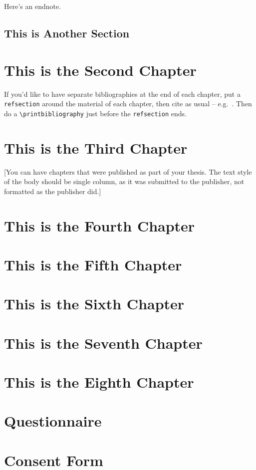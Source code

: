 \documentclass{article}
\begin{document}
\lipsum[3] 

\lipsum[4-5] 

Here's an endnote.

\section{This is Another Section}
\lipsum[6-7] 

\chapter{This is the Second Chapter}
\begin{refsection}
If you'd like to have separate bibliographies at the end of each chapter, put a \verb|refsection| around the material of each chapter, then cite as usual -- e.g.~\citep{GMP81,Ful83}. Then do a \verb|\printbibliography| just before the \verb|refsection| ends. 

\printbibliography[heading=subbibliography]
\end{refsection}


\chapter{This is the Third Chapter}


[You can have chapters that were published as part of your thesis. The text style of the body should be single column, as it was submitted to the publisher, not formatted as the publisher did.]

\chapter{This is the Fourth Chapter}
\chapter{This is the Fifth Chapter}
\chapter{This is the Sixth Chapter}
\chapter{This is the Seventh Chapter}
\chapter{This is the Eighth Chapter}

\printbibliography[heading=bibintoc]



\chapter{Questionnaire}
\chapter{Consent Form}



\theendnotes

\pocketmaterial
{}
\end{document}

